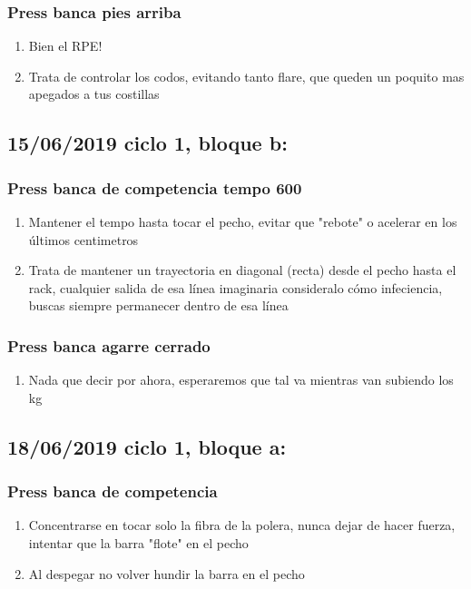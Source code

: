 \documentclass[11pt]{article}
\begin{document}
\subsubsection{Press banca pies arriba}
\label{sec:org3a4d07d}
\begin{enumerate}
\item Bien el RPE!
\item Trata de controlar los codos, evitando tanto flare, que queden un
poquito mas apegados a tus costillas
\end{enumerate}
\subsection{15/06/2019 ciclo 1, bloque b:}
\label{sec:org64513a0}
\subsubsection{Press banca de competencia tempo 600}
\label{sec:orga7e88fc}
\begin{enumerate}
\item Mantener el tempo hasta tocar el pecho, evitar que "rebote" o acelerar en los últimos centimetros
\item Trata de mantener un trayectoria en diagonal (recta) desde el pecho
hasta el rack, cualquier salida de esa línea imaginaria consideralo
cómo infeciencia, buscas siempre permanecer dentro de esa línea
\end{enumerate}
\subsubsection{Press banca agarre cerrado}
\label{sec:orgff99e9a}
\begin{enumerate}
\item Nada que decir por ahora, esperaremos que tal va mientras van
subiendo los kg
\end{enumerate}
\subsection{18/06/2019 ciclo 1, bloque a:}
\label{sec:org00b85c3}
\subsubsection{Press banca de competencia}
\label{sec:orge5b80bb}
\begin{enumerate}
\item Concentrarse en tocar solo la fibra de la polera, nunca dejar de
hacer fuerza, intentar que la barra "flote" en el pecho
\item Al despegar no volver hundir la barra en el pecho
\end{enumerate}
\end{document}
